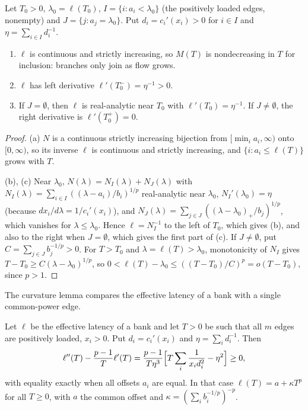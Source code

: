 \begin{lemma}\label{lem:bank}
Let $T_0>0$, $\lambda_0=\ell(T_0)$, $I=\{i:a_i<\lambda_0\}$ (the positively
loaded edges, nonempty) and $J=\{j:a_j=\lambda_0\}$. Put
$d_i=c_i'(x_i)>0$ for $i\in I$ and $\eta=\sum_{i\in I}d_i^{-1}$.
\begin{enumerate}
\item[(a)] $\ell$ is continuous and strictly increasing, so $M(T)$ is
 nondecreasing in $T$ for inclusion: branches only join as flow grows.
\item[(b)] $\ell$ has left derivative $\ell'(T_0^-)=\eta^{-1}>0$.
\item[(c)] If $J=\emptyset$, then $\ell$ is real-analytic near $T_0$ with
 $\ell'(T_0)=\eta^{-1}$. If $J\ne\emptyset$, the right derivative is
 $\ell'(T_0^+)=0$.
\end{enumerate}
\end{lemma}

\begin{proof}
(a) $N$ is a continuous strictly increasing bijection from
$[\min_ia_i,\infty)$ onto $[0,\infty)$, so its inverse $\ell$ is continuous
and strictly increasing, and $\{i:a_i\le\ell(T)\}$ grows with $T$.

(b), (c) Near $\lambda_0$, $N(\lambda)=N_I(\lambda)+N_J(\lambda)$ with
$N_I(\lambda)=\sum_{i\in I}((\lambda-a_i)/b_i)^{1/p}$ real-analytic near
$\lambda_0$, $N_I'(\lambda_0)=\eta$ (because $dx_i/d\lambda=1/c_i'(x_i)$), and
$N_J(\lambda)=\sum_{j\in J}((\lambda-\lambda_0)_+/b_j)^{1/p}$, which vanishes
for $\lambda\le\lambda_0$. Hence $\ell=N_I^{-1}$ to the left of $T_0$, which
gives (b), and also to the right when $J=\emptyset$, which gives the first
part of (c). If $J\ne\emptyset$, put $C=\sum_{j\in J}b_j^{-1/p}>0$. For
$T>T_0$ and $\lambda=\ell(T)>\lambda_0$, monotonicity of $N_I$ gives
$T-T_0\ge C(\lambda-\lambda_0)^{1/p}$, so
$0<\ell(T)-\lambda_0\le((T-T_0)/C)^p=o(T-T_0)$, since $p>1$.
\end{proof}

The curvature lemma compares the effective latency of a bank with a single
common-power edge.

\begin{lemma}\label{lem:curvature}
Let $\ell$ be the effective latency of a bank and let $T>0$ be such that all
$m$ edges are positively loaded, $x_i>0$. Put $d_i=c_i'(x_i)$ and
$\eta=\sum_id_i^{-1}$. Then
\begin{equation}\label{eq:min_curv}
 \ell''(T)-\frac{p-1}{T}\ell'(T)
 =\frac{p-1}{T\eta^3}\Bigl[T\sum_i\frac1{x_id_i^2}-\eta^2\Bigr]\ge0,
\end{equation}
with equality exactly when all offsets $a_i$ are equal. In that case
$\ell(T)=a+\kappa T^p$ for all $T\ge0$, with $a$ the common offset and
$\kappa=(\sum_ib_i^{-1/p})^{-p}$.
\end{lemma}

